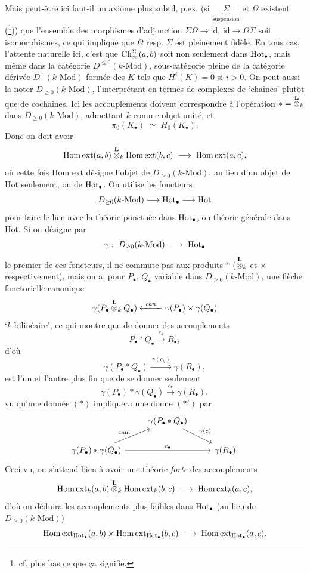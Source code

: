 Mais peut-être ici faut-il un axiome plus subtil, p.ex. (si $\underbrace{\Sigma}_{\text{suspension}}$ et $\Omega$ existent (\footnote[7]{cf. plus bas ce que ça signifie.})) que l'ensemble des morphismes d'adjonction $\Sigma\Omega \longrightarrow \mathrm{id}$, $\mathrm{id} \longrightarrow \Omega\Sigma$ soit isomorphismes, ce qui implique que $\Omega$ resp. $\Sigma$ est pleinement fidèle. En tous cas, l'attente naturelle ici, c'est que $\mathrm{Ch}^{\Sigma}_{\infty}(a,b)$ soit non seulement dans $\mathrm{Hot}_{\bullet}$, mais même dans la catégorie $D^{\leq 0}(k\text{-Mod})$, sous-catégorie pleine de la catégorie dérivée $D^{-}(k\text{-Mod})$ formée des $K$ tels que $H^{i}(K) = 0$ si $i > 0$. On peut aussi la noter $D_{\geq 0}(k\text{-Mod})$, l'interprétant en
termes de complexes de `chaînes' plutôt que de cochaînes. Ici les accouplements doivent correspondre à l'opération $* = \overset{\mathbf{L}}{\otimes}_k$ dans $D_{\geq 0}(k\text{-Mod})$, admettant $k$ comme objet unité, et
\[
\pi_0(K_{\bullet}) \;\simeq\; H_0(K_{\bullet}).
\]
Donc on doit avoir
\[
\mathrm{Hom\,ext}(a,b) \overset{\mathbf{L}}{\otimes}_k \mathrm{Hom\,ext}(b,c) \;\longrightarrow\; \mathrm{Hom\,ext}(a,c),
\]
où cette fois Hom ext désigne l'objet de $D_{\geq 0}(k\text{-Mod})$, au lieu d'un objet de Hot seulement, ou de $\mathrm{Hot}_{\bullet}$. On utilise les foncteurs
\[
D_{\geq 0}(k\text{-Mod}) \longrightarrow \mathrm{Hot}_{\bullet} \longrightarrow \mathrm{Hot}
\]
pour faire le lien avec la théorie ponctuée dans $\mathrm{Hot}_{\bullet}$, ou théorie générale dans Hot. Si on désigne par
\[
\gamma :\ D_{\geq 0}(k\text{-Mod}) \;\longrightarrow\; \mathrm{Hot}_{\bullet}
\]
le premier de ces foncteurs, il ne commute pas aux produits $*$ ($\overset{\mathbf{L}}{\otimes}_k$ et $\times$ respectivement), mais on a, pour $P_{\bullet}$, $Q_{\bullet}$ variable dans $D_{\geq 0}(k\text{-Mod})$, une flèche fonctorielle canonique %
\[
\gamma(P_{\bullet} \overset{\mathbf{L}}{\otimes}_k Q_{\bullet}) \xleftarrow{\ \mathit{can.}\ } \gamma(P_{\bullet})\times\gamma(Q_{\bullet})
\]
`$k$-bilinéaire', ce qui montre que de donner des accouplements
\[
P_{\bullet} * Q_{\bullet} \xrightarrow{\ c_k\ } R_{\bullet},
\]
d'où
\[
\gamma(P_{\bullet} * Q_{\bullet}) \xrightarrow{\ \gamma(c_k)\ } \gamma(R_{\bullet}), \tag*{$(*)$}
\]
est l'un et l'autre plus fin que de se donner seulement
\[
\gamma(P_{\bullet}) * \gamma(Q_{\bullet}) \xrightarrow{\ c_{\bullet}\ } \gamma(R_{\bullet}), \tag*{$(*')$}
\]
vu qu'une donnée $(*)$ impliquera une donne $(*')$ par %
\[
\begin{tikzcd}
 & \gamma(P_{\bullet} * Q_{\bullet}) \arrow[dr, "\gamma(c)"] & \\
\gamma(P_{\bullet}) * \gamma(Q_{\bullet}) \arrow[ur, "\text{can.}"] \arrow[rr, "c_{\bullet}"] & & \gamma(R_{\bullet}).
\end{tikzcd}
\]
Ceci vu, on s'attend bien à avoir une théorie \textit{forte} des accouplements
\[
\mathrm{Hom\,ext}_k(a,b) \overset{\mathbf{L}}{\otimes}_k \mathrm{Hom\,ext}_k(b,c) \;\longrightarrow\; \mathrm{Hom\,ext}_k(a,c),
\]
d'où on déduira les accouplements plus faibles dans $\mathrm{Hot}_{\bullet}$ (au lieu de $D_{\geq 0}(k\text{-Mod})$)
\[
\mathrm{Hom\,ext}_{\mathrm{Hot}_{\bullet}}(a,b) \times \mathrm{Hom\,ext}_{\mathrm{Hot}_{\bullet}}(b,c) \;\longrightarrow\; \mathrm{Hom\,ext}_{\mathrm{Hot}_{\bullet}}(a,c).
\]

